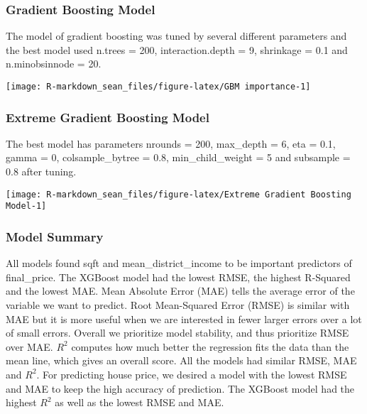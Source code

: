 \documentclass[11pt,]{article}
\begin{document}
\hypertarget{gradient-boosting-model}{%
\subsubsection{Gradient Boosting Model}\label{gradient-boosting-model}}

The model of gradient boosting was tuned by several different parameters
and the best model used n.trees = 200, interaction.depth = 9, shrinkage
= 0.1 and n.minobsinnode = 20.

\begin{center}\texttt{[image: R-markdown\_sean\_files/figure-latex/GBM importance-1]} \end{center}

\hypertarget{extreme-gradient-boosting-model}{%
\subsubsection{Extreme Gradient Boosting
Model}\label{extreme-gradient-boosting-model}}

The best model has parameters nrounds = 200, max\_depth = 6, eta = 0.1,
gamma = 0, colsample\_bytree = 0.8, min\_child\_weight = 5 and subsample
= 0.8 after tuning.

\begin{center}\texttt{[image: R-markdown\_sean\_files/figure-latex/Extreme Gradient Boosting Model-1]} \end{center}

\hypertarget{model-summary}{%
\subsubsection{Model Summary}\label{model-summary}}

All models found sqft and mean\_district\_income to be important
predictors of final\_price. The XGBoost model had the lowest RMSE, the
highest R-Squared and the lowest MAE. Mean Absolute Error (MAE) tells
the average error of the variable we want to predict. Root Mean-Squared
Error (RMSE) is similar with MAE but it is more useful when we are
interested in fewer larger errors over a lot of small errors. Overall we
prioritize model stability, and thus prioritize RMSE over MAE. \(R^2\)
computes how much better the regression fits the data than the mean
line, which gives an overall score. All the models had similar RMSE, MAE
and \(R^2\). For predicting house price, we desired a model with the
lowest RMSE and MAE to keep the high accuracy of prediction. The XGBoost
model had the highest \(R^2\) as well as the lowest RMSE and MAE.
\end{document}
